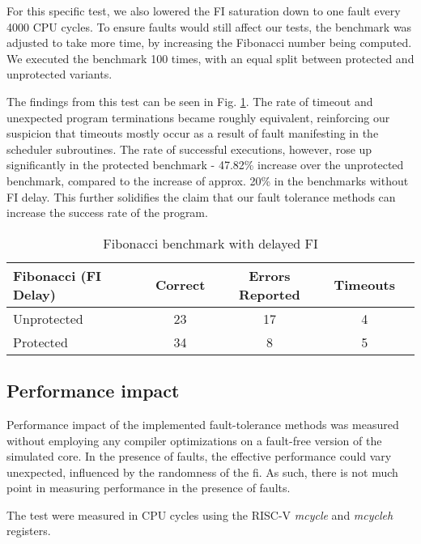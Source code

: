 For this specific test, we also lowered the FI saturation down to one fault every 4000 CPU cycles. To ensure faults would still affect our tests, the benchmark was adjusted to take more time, by increasing the Fibonacci number being computed. We executed the benchmark 100 times, with an equal split between protected and unprotected variants.

The findings from this test can be seen in Fig. \ref{tab:fib50_delayed}. The rate of timeout and unexpected program terminations became roughly equivalent, reinforcing our suspicion that timeouts mostly occur as a result of fault manifesting in the scheduler subroutines. The rate of successful executions, however, rose up significantly in the protected benchmark - 47.82\% increase over the unprotected benchmark, compared to the increase of approx. 20\% in the benchmarks without FI delay. This further solidifies the claim that our fault tolerance methods can increase the success rate of the program.

\begin{table}[h]
\centering
\begin{tabular}{|l|c|c|c|c|}
\hline
\textbf{Fibonacci (FI Delay)} & \textbf{Correct} & \textbf{Errors Reported} & \textbf{Timeouts} \\
\hline
Unprotected & 23 & 17 & 4 \\
Protected & 34 & 8 & 5 \\
\hline
\end{tabular}
\caption{Fibonacci benchmark with delayed FI}
\label{tab:fib50_delayed}
\end{table}

\subsection{Performance impact}

Performance impact of the implemented fault-tolerance methods was measured without employing any compiler optimizations on a fault-free version of the simulated core. In the presence of faults, the effective performance could vary unexpected, influenced by the randomness of the \acrshort{fi}. As such, there is not much point in measuring performance in the presence of faults.

The test were measured in CPU cycles using the RISC-V \textit{mcycle} and \textit{mcycleh} registers.

